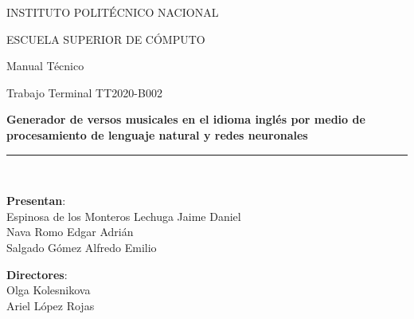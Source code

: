 \documentclass[12pt, a4paper, titlepage]{article}
\begin{document}
\begin{titlepage}
		\vspace*{.25cm}								%
		
		\begin{center}
			
			\begin{LARGE}
				\textcolor{guindapoli}{INSTITUTO POLITÉCNICO NACIONAL}\\
			\end{LARGE}	
			
			\vspace*{0.2in}
			
			\begin{Large}
				\textcolor{azulescom}{ESCUELA SUPERIOR DE CÓMPUTO}\\
			\end{Large}	
			
			\vspace*{0.4in}
			
			\begin{large}
				Manual Técnico\\
			\end{large}	
			
			\vspace*{0.4in}
			
			\begin{large}
				Trabajo Terminal TT2020-B002\\
			\end{large}
			
			\vspace*{0.2in}
			
			\begin{Large}
				\textbf{Generador de versos musicales en el idioma
					inglés por medio de procesamiento de lenguaje
					natural y redes neuronales}\\
			\end{Large}
			
			\vspace*{0.2in}
			
			\rule{80mm}{.1mm}\\
			\vspace*{0.1in}
			
			\begin{large}
				\begin{center}
					\textbf{Presentan}:\\
					Espinosa de los Monteros Lechuga Jaime Daniel\\
					Nava Romo Edgar Adrián\\
					Salgado Gómez Alfredo Emilio\\
				\end{center}
			\end{large}
			
			\begin{large}
				\textbf{Directores}:\\
				Olga Kolesnikova\\
				Ariel López Rojas\\
			\end{large}
			
		\end{center}
		
	\end{titlepage}
	
\end{document}
